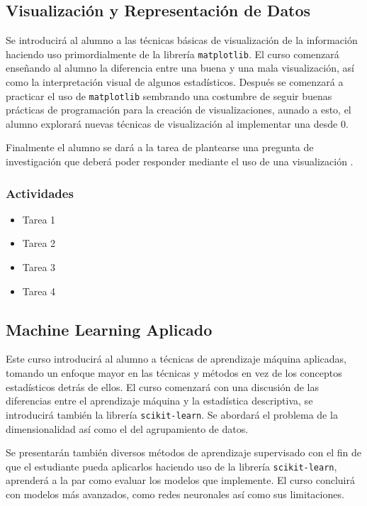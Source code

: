 \documentclass{article}
\begin{document}
        \subsection{Visualización y Representación de Datos}

            Se introducirá al alumno a las técnicas básicas de visualización de la información haciendo uso primordialmente de la librería \texttt{matplotlib}. El curso comenzará enseñando al alumno la diferencia entre una buena y una mala visualización, así como la interpretación visual de algunos estadísticos. Después se comenzará a practicar el uso de \texttt{matplotlib} sembrando una costumbre de seguir buenas prácticas de programación para la creación de visualizaciones, aunado a esto, el alumno explorará nuevas técnicas de visualización al implementar una desde 0. 
            
            Finalmente el alumno se dará a la tarea de plantearse una pregunta de investigación que deberá poder responder mediante el uso de una visualización \cite{plotting}.

            \subsubsection{Actividades}

                \begin{itemize}
                    \item Tarea 1
                    \item Tarea 2
                    \item Tarea 3
                    \item Tarea 4
                \end{itemize}

        \subsection{Machine Learning Aplicado}

            Este curso introducirá al alumno a técnicas de aprendizaje máquina aplicadas, tomando un enfoque mayor en las técnicas y métodos en vez de los conceptos estadísticos detrás de ellos. El curso comenzará con una discusión de las diferencias entre el aprendizaje máquina y la estadística descriptiva, se introducirá también la librería \texttt{scikit-learn}. Se abordará el problema de la dimensionalidad así como el del agrupamiento de datos.

            Se presentarán también diversos métodos de aprendizaje supervisado con el fin de que el estudiante pueda aplicarlos haciendo uso de la librería \texttt{scikit-learn}, aprenderá a la par como evaluar los modelos que implemente. El curso concluirá con modelos más avanzados, como redes neuronales así como sus limitaciones.
\end{document}
